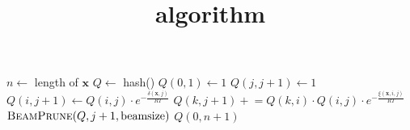 \documentclass[preview]{standalone}
\title{algorithm}
\newcommand{\pluseq}{\mathrel{+}=}
\let\oldReturn\Return
\renewcommand{\Return}{\State\oldReturn}
\begin{document}

\begin{algorithmic}[1]
\newcommand{\INDSTATE}[1][1]{\STATE\hspace{#1\algorithmicindent}}

    \State $n \gets$ length of $\mathbf x$
    \State $Q \gets$ hash() 
    \State $Q(0,1) \gets 1$  
        \State $Q(j,j+1) \gets 1$  %
            \State $Q(i,j+1) \gets Q(i,j) \cdot e^{-\frac{\delta(\mathbf{x},j)}{RT}} $ 
                    \State $Q(k,j+1) \pluseq {Q(k,i) \cdot Q(i,j) \cdot e^{-\frac{\xi(\mathbf{x},i,j)}{RT}}} $ 
                \EndFor
            \EndIf
        \EndFor
        \State $\textsc {BeamPrune}(Q,j+1, \textrm {beamsize})$
    \EndFor
    \Return $Q(0,n+1)$
\EndProcedure


        




\end{algorithmic}
\end{document}
